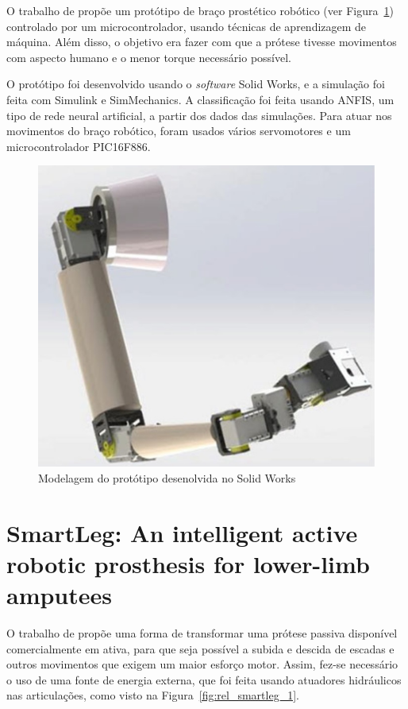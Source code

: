 
O trabalho de  propõe um protótipo de braço prostético robótico (ver Figura~\ref{fig:rel_kumar_1}) controlado por um microcontrolador, usando técnicas de aprendizagem de máquina. Além disso, o objetivo era fazer com que a prótese tivesse movimentos com aspecto humano e o menor torque necessário possível.

O protótipo foi desenvolvido usando o \textit{software} Solid Works, e a simulação foi feita com Simulink e SimMechanics. A classificação foi feita usando ANFIS, um tipo de rede neural artificial, a partir dos dados das simulações. Para atuar nos movimentos do braço robótico, foram usados vários servomotores e um microcontrolador PIC16F886.

\begin{figure}[!htp]
	\caption{\label{fig:rel_kumar_1}Modelagem do protótipo desenolvida no Solid Works}
	\begin{center}
	    \includegraphics[width=.3\textwidth]{resources/rel_kumar_1}
	\end{center}
\end{figure}


\section{SmartLeg: An intelligent active robotic prosthesis for lower-limb amputees}
\label{sec:rel_smartleg}

O trabalho de  propõe uma forma de transformar uma prótese passiva disponível comercialmente em ativa, para que seja possível a subida e descida de escadas e outros movimentos que exigem um maior esforço motor. Assim, fez-se necessário o uso de uma fonte de energia externa, que foi feita usando atuadores hidráulicos nas articulações, como visto na Figura~\ref{fig:rel_smartleg_1}.


